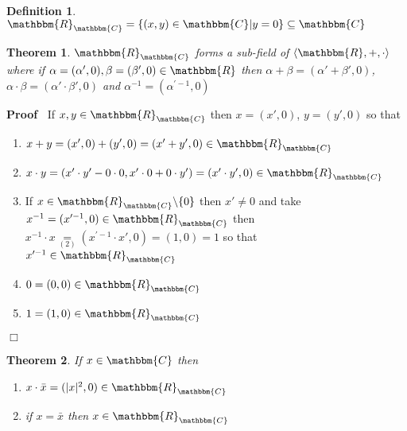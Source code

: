 \documentclass{book}
\newcommand{\equallim}{\mathop{=}\limits}
\newcommand{\nocomma}{}
\newenvironment{proof}{\noindent\textbf{Proof\ }}{\hspace*{\fill}$\Box$\medskip}
\newtheorem{definition}{Definition}
{\theorembodyfont{\rmfamily}\newtheorem{example}{Example}}
\newtheorem{theorem}{Theorem}
\begin{document}
{{\begin{definition}
  \label{reals embedded in complex
  numbers}{}$\mathbbm{R}_{\mathbbm{C}} = \{
  (x, y) \in \mathbbm{C}|y = 0 \} \subseteq \mathbbm{C}$
\end{definition}

\begin{theorem}
  \label{subfield real embedded in the complex
  field}$\mathbbm{R}_{\mathbbm{C}}$ forms a sub-field of $\langle \mathbbm{R},
  +, \cdot \rangle$ where if $\alpha = (\alpha', 0), \beta = (\beta', 0) \in
  \mathbbm{R}$ then $\alpha + \beta = (\alpha' + \beta', 0) \nocomma$, $\alpha
  \cdot \beta = (\alpha' \cdot \beta', 0)$ and $\alpha^{- 1} = (\alpha^{\prime
  - 1}, 0)$
\end{theorem}

\begin{proof}
  If $x, y \in \mathbbm{R}_{\mathbbm{C}}$ then $x = (x', 0)$, $y = (y', 0)$ so
  that
  \begin{enumerate}
    \item $x + y = (x', 0) + (y', 0) = (x' + y', 0) \in
    \mathbbm{R}_{\mathbbm{C}}$
    
    \item $x \cdot y = (x' \cdot y' - 0 \cdot 0, x' \cdot 0 + 0 \cdot y') =
    (x' \cdot y', 0) \in \mathbbm{R}_{\mathbbm{C}}$
    
    \item If $x \in \mathbbm{R}_{\mathbbm{C}} \backslash \{ 0 \}$ then $x'
    \neq 0$ and take $x^{- 1} = (x^{\prime - 1}, 0) \in
    \mathbbm{R}_{\mathbbm{C}}$ then $x^{- 1} \cdot x \equallim_{(2)}
    (x^{\prime - 1} \cdot x', 0) = (1, 0) = 1$ so that $x^{\prime - 1} \in
    \mathbbm{R}_{\mathbbm{C}}$
    
    \item $0 = (0, 0) \in \mathbbm{R}_{\mathbbm{C}}$
    
    \item $1 = (1, 0) \in \mathbbm{R}_{\mathbbm{C}}$
  \end{enumerate}
\end{proof}

\begin{theorem}
  If $x \in \mathbbm{C}$ then
  \begin{enumerate}
    \item $x \cdot \bar{x} = (| x |^2, 0) \in \mathbbm{R}_{\mathbbm{C}}$
    
    \item if $x = \bar{x}$ then $x \in \mathbbm{R}_{\mathbbm{C}}$
  \end{enumerate}
\end{theorem}

}}
\end{document}
